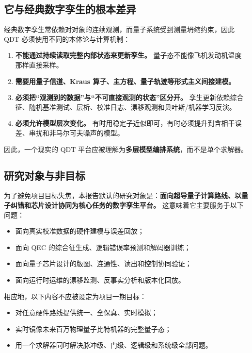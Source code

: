 \documentclass[11pt,a4paper]{article}
\newcommand{\QDT}{QDT}
\newcommand{\QEC}{QEC}
\begin{document}
\subsection{它与经典数字孪生的根本差异}

经典数字孪生常依赖对对象的连续观测，而量子系统受到测量坍缩约束，因此 \QDT{} 必须使用不同的本体论与计算机制：

\begin{enumerate}
  \item \textbf{不能通过持续读取完整内部状态来更新孪生。} 量子态不能像飞机发动机温度那样直接采样。
  \item \textbf{需要用量子信道、Kraus 算子、主方程、量子轨迹等形式主义间接建模。}
  \item \textbf{必须把“观测到的数据”与“不可直接观测的状态”区分开。} 孪生更新依赖综合征、随机基准测试、层析、校准日志、漂移观测和贝叶斯/机器学习反演。
  \item \textbf{必须允许模型层次变化。} 有时用稳定子近似即可，有时必须提升到含相干误差、串扰和非马尔可夫噪声的模型。
\end{enumerate}

因此，一个现实的 \QDT{} 平台应被理解为\textbf{多层模型编排系统}，而不是单个求解器。

\subsection{研究对象与非目标}

为了避免项目目标失焦，本报告默认的研究对象是：\textbf{面向超导量子计算路线、以量子纠错和芯片设计协同为核心任务的数字孪生平台。} 这意味着它主要服务于以下问题：

\begin{itemize}
  \item 面向真实校准数据的硬件建模与误差回放；
  \item 面向 \QEC{} 的综合征生成、逻辑错误率预测和解码器训练；
  \item 面向量子芯片设计的版图、连通性、读出和控制协同验证；
  \item 面向运行时运维的漂移监测、反事实分析和版本化回放。
\end{itemize}

相应地，以下内容不应被设定为项目一期目标：

\begin{itemize}
  \item 对任意硬件路线提供统一、全保真、实时模拟；
  \item 实时镜像未来百万物理量子比特机器的完整量子态；
  \item 用一个求解器同时解决脉冲级、门级、逻辑级和系统级全部问题。
\end{itemize}
\end{document}
